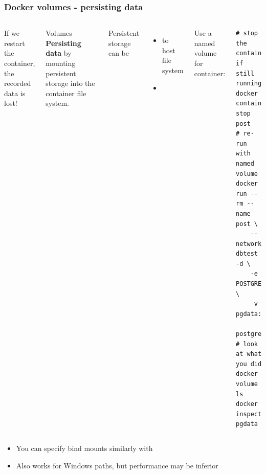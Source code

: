 \begin{frame}[fragile]
	\frametitle{Docker volumes - persisting data}
	\begin{columns}
		If we restart the  container, the recorded data is lost!
		\begin{block}{Volumes}
			\textbf{Persisting data} by mounting persistent storage into the container file system.
		\end{block}
		Persistent storage can be
		\begin{itemize}
			\item {} to host file system
			\item {} 
		\end{itemize}
		
		Use a named volume for  container:
		\begin{lstlisting}
# stop the container if still running
docker container stop post
# re-run with named volume
docker run --rm --name post \
	--network dbtest -d \
	-e POSTGRES_PASSWORD=holymoly \
	-v pgdata:/var/lib/postgresql/data
	postgres:latest
# look at what you did
docker volume ls
docker inspect pgdata
		\end{lstlisting}
	\end{columns}
	\begin{itemize}
		\item You can specify bind mounts similarly with 
		\item Also works for Windows paths, but performance may be inferior
	\end{itemize}
\end{frame}

